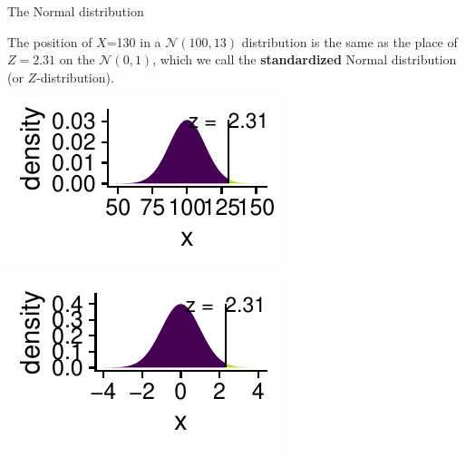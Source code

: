 \documentclass[10pt]{beamer}\usepackage[]{graphicx}\usepackage[]{color}
\newenvironment{knitrout}{}{} %
\begin{document}
\begin{frame}[fragile]{The Normal distribution}
	
	\vspace*{-.01in}
	
	\small{The position of $X$=130 in a $\mathcal{N}(100,13)$ distribution is the same as
		the place of $Z=2.31$ on the $\mathcal{N}(0,1)$, which we call the \textbf{standardized} Normal distribution (or	$Z$-distribution).}
	
	
\begin{knitrout}\tiny
{}\color{fgcolor}

{\centering \includegraphics[width=0.55\linewidth]{figure/probs-1} 

}




{\centering \includegraphics[width=0.55\linewidth]{figure/probs-2} 

}


\end{knitrout}
	
\end{frame} 

\end{document}
